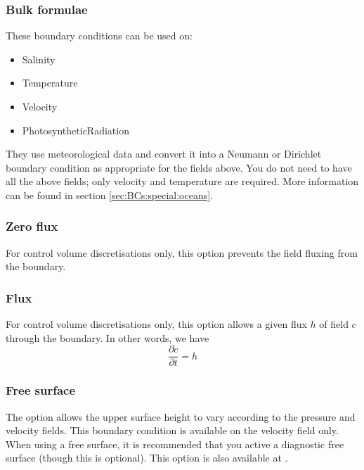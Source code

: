 \subsubsection{Bulk formulae}\label{sec:bulk_formulae}

These boundary conditions can be used on:
\begin{itemize}
\item Salinity
\item Temperature
\item Velocity
\item PhotosyntheticRadiation
\end{itemize}

They use meteorological data and convert it into a Neumann or Dirichlet boundary condition
as appropriate for the fields above. You do not need to have all the above fields; only
velocity and temperature are required. More information can be found in section \ref{sec:BCs:special:oceans}.

\subsubsection{Zero flux}

For control volume discretisations only, this option prevents the field fluxing from the boundary.

\subsubsection{Flux}

For control volume discretisations only, this option allows a given flux $h$ of field $c$ through the boundary. In other words, we have
\begin{equation*}
   \frac{\partial c}{\partial t} = h
\end{equation*}

\subsubsection{Free surface}\label{subsec:free_surface_bc}

The  option allows the upper surface height to vary according to the pressure and velocity fields. This boundary condition is available on the velocity field only. When using a free surface, it is recommended that you active a diagnostic free surface (though this is optional). This option is also available at .

